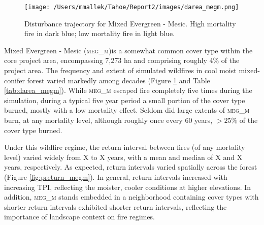 \begin{figure}
\centering
    \texttt{[image: /Users/mmallek/Tahoe/Report2/images/darea\_megm.png]}
    \caption{Disturbance trajectory for Mixed Evergreen - Mesic. High mortality fire in dark blue; low mortality fire in light blue.}
	\label{fig:darea_megm}
\end{figure}

Mixed Evergreen - Mesic (\textsc{meg\_m})is a somewhat common cover type within the core project area, encompassing 7,273 ha and comprising roughly 4\% of the project area. The frequency and extent of simulated wildfires in cool moist mixed-conifer forest varied markedly among decades (Figure \ref{fig:darea_megm} and Table \ref{tab:darea_megm}). While \textsc{meg\_m} escaped fire completely five times during the simulation, during a typical five year period a small portion of the cover type burned, mostly with a low mortality effect. Seldom did large extents of \textsc{meg\_m} burn, at any mortality level, although roughly once every 60 years, $>25\%$ of the cover type burned. 

Under this wildfire regime, the return interval between fires (of any mortality level) varied widely from X to X years, with a mean and median of X and X years, respectively. As expected, return intervals varied spatially across the forest (Figure \ref{fig:preturn_megm}). In general, return intervals increased with increasing TPI, reflecting the moister, cooler conditions at higher elevations. In addition, \textsc{meg\_m} stands embedded in a neighborhood containing cover types with shorter return intervals exhibited shorter return intervals, reflecting the importance of landscape context on fire regimes.



